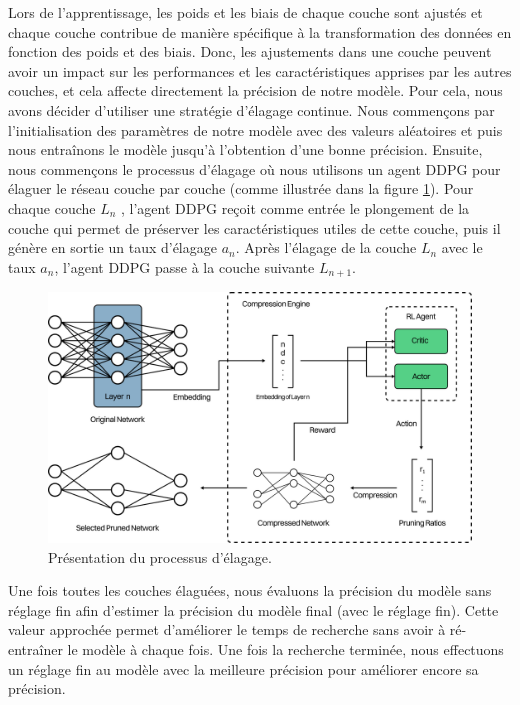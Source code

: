 Lors de l'apprentissage, les poids et les biais de chaque couche sont ajustés et chaque couche contribue de manière spécifique à la transformation des données en fonction des poids et des biais. Donc, les ajustements dans une couche peuvent avoir un impact sur les performances et les caractéristiques apprises par les autres couches, et cela affecte directement la précision de notre modèle. Pour cela, nous avons décider d'utiliser une stratégie d'élagage continue. Nous commençons par l'initialisation des paramètres de notre modèle avec des valeurs aléatoires et puis nous entraînons le modèle jusqu’à l'obtention d'une bonne précision. Ensuite, nous commençons le processus d'élagage où nous utilisons un agent DDPG pour élaguer le réseau couche par couche (comme illustrée dans la figure \ref{fig:global-solution}). Pour chaque couche $L_n$ , l'agent DDPG reçoit comme entrée le plongement de la couche qui permet de préserver les caractéristiques utiles de cette couche, puis il génère en sortie un taux d'élagage $a_n$. Après l'élagage de la couche $L_n$ avec le taux $a_n$, l'agent DDPG passe à la couche suivante $L_{n+1}$.

\begin{figure}[hbt!]
  \centering
  \includegraphics[width=14cm]{images_pfe/global-solution.png}
  \caption{Présentation du processus d'élagage.}
  \label{fig:global-solution}
\end{figure}
\FloatBarrier
\medskip


Une fois toutes les couches élaguées, nous évaluons la précision du modèle sans réglage fin afin d'estimer la précision du modèle final (avec le réglage fin). Cette valeur approchée permet d'améliorer le temps de recherche sans avoir à ré-entraîner le modèle à chaque fois. Une fois la recherche terminée, nous effectuons un réglage fin au modèle avec la meilleure précision pour améliorer encore sa précision.


